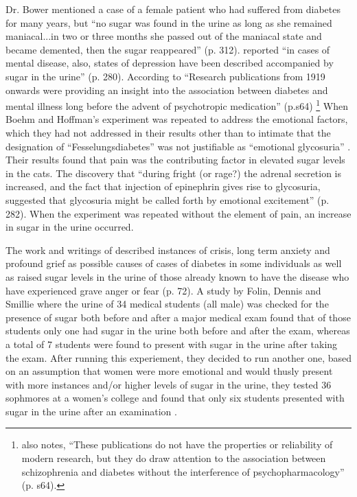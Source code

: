 \documentclass[12pt]{article}
\begin{document}
Dr. Bower  \citep{bond_1896_relation} mentioned a case of a female patient who had suffered from diabetes for many years, but ``no sugar was found in the urine as long as she remained maniacal...in two or three months she passed out of the maniacal state and became demented, then the sugar reappeared'' (p. 312). 
\citet{Cannon_emotional_1911} reported ``in cases of mental disease, also, states of depression have been described accompanied by sugar in the urine'' (p. 280). 
According to \citet{kohen_2004_diabetes} ``Research publications from 1919 onwards were providing an insight into the association between diabetes and mental illness long before the advent of psychotropic medication'' (p.s64) \footnote{\citet{kohen_2004_diabetes} also notes, ``These publications do not have the properties or reliability of modern research, but they do draw attention to the association between schizophrenia and diabetes without the interference of psychopharmacology'' (p. s64).} 
When Boehm and Hoffman's experiment was repeated to address the emotional factors, which they had not addressed in their results other than to intimate that the designation of ``Fesselungsdiabetes'' was not justifiable as ``emotional glycosuria'' \citep[p.281] {cannon_1916_bodily}. Their results found that pain was the contributing factor in elevated sugar levels in the cats. The discovery that ``during fright (or rage?) the adrenal secretion is increased, and the fact that injection of epinephrin gives rise to glycosuria, suggested that glycosuria might be called forth by emotional excitement'' (p. 282). When the experiment was repeated without the element of pain, an increase in sugar in the urine occurred. 

The work and writings of \citet{naunyn_diabetes_1898} described instances of crisis, long term anxiety and profound grief as possible causes of cases of diabetes in some individuals as well as raised sugar levels in the urine of those already known to have the disease who have experienced grave anger or fear (p. 72). 
A study by Folin, Dennis and Smillie where the urine of 34 medical students (all male) was checked for the presence of sugar both before and after a major medical exam found that of those students only one had sugar in the urine both before and after the exam, whereas a total of 7 students were found to present with sugar in the urine after taking the exam.
After running this experiement, they decided to run another one, based on an assumption that women were more emotional and would thusly present with more instances and/or higher levels of sugar in the urine, they tested 36 sophmores at a women's college and found that only six students presented with sugar in the urine after an examination \citep [p. 343] {bowman_sugar_1929}. 
\end{document}

